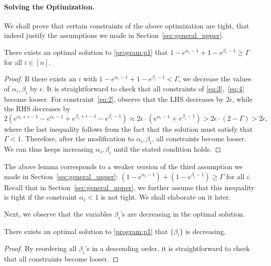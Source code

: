 \paragraph{Solving the Optimization.} We shall prove that certain constraints of the above optimization are tight, that indeed justify the assumptions we made in Section~\ref{sec:general_upper}. 

\begin{lemma}
There exists an optimal solution to \eqref{program:p1} that $1-e^{\alpha_i-1} + 1-e^{\beta_i-1} \ge \Gamma$ for all $i\in[n]$.
\end{lemma}
\begin{proof}
If there exists an $i$ with $1-e^{\alpha_i-1} + 1-e^{\beta_i-1} < \Gamma$, we decrease the values of $\alpha_i, \beta_i$ by $\epsilon$. It is straightforward to check that all constraints of \eqref{eq:3},~\eqref{eq:4} become looser. For constraint~\eqref{eq:2}, observe that the LHS decreases by $2\epsilon$, while the RHS decreases by
\[
2 (e^{\alpha_i+\epsilon-1} - e^{\alpha_i-1} + e^{\beta_i+\epsilon-1} - e^{\beta_i-1}) \approx 2\epsilon \cdot (e^{\alpha_i-1} + e^{\beta_i-1}) > 2 \epsilon \cdot (2-\Gamma) > 2\epsilon, 
\]
where the last inequality follows from the fact that the solution must satisfy that $\Gamma < 1$. Therefore, after the modification to $\alpha_i, \beta_i$, all constraints become looser. We can thus keeps increasing $\alpha_i, \beta_i$ until the stated condition holds.
\end{proof}

The above lemma corresponds to a weaker version of the third assumption we made in Section~\ref{sec:general_upper}: $(1-e^{\alpha_{i}-1}) + (1-e^{\beta_i-1}) \ge \Gamma$ for all $i$. Recall that in Section~\ref{sec:general_upper}, we further assume that this inequality is tight if the constraint $\alpha_i < 1$ is not tight. We shall elaborate on it later.

Next, we observe that the variables $\beta_i$'s are decreasing in the optimal solution. 
\begin{lemma}
There exists an optimal solution to \eqref{program:p1} that $\{\beta_i\}$ is decreasing.
\end{lemma}
\begin{proof}
By reordering all $\beta_i$'s in a descending order, it is straightforward to check that all constraints become looser.	
\end{proof}

